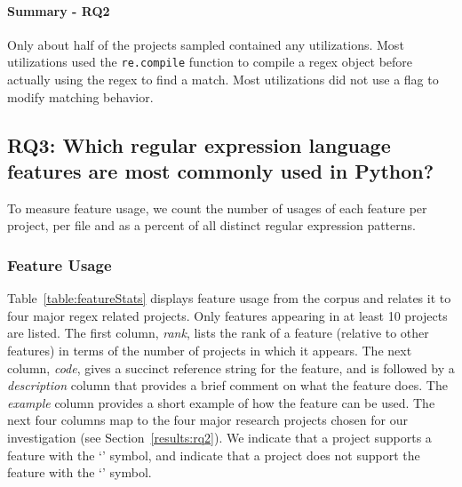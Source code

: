 

% 


\paragraph{Summary - RQ2}

Only about half of the projects sampled contained any utilizations.  Most utilizations used the {\tt re.compile} function to compile a regex object before actually using the regex to find a match.  Most utilizations did not use a flag to modify matching behavior.  





\subsection{RQ3: Which regular expression language features are most commonly used in Python?}
\label{results:rq3}

To measure feature usage, we  count the number of usages of each feature per project, per file and as a percent of all distinct regular expression patterns.



\subsubsection{Feature Usage}
\label{sec:featureUsage}
Table~\ref{table:featureStats} displays feature usage from the corpus and relates it to four major regex related projects. Only features appearing in at least 10 projects are listed.
The first column, \emph{rank}, lists the rank of a feature (relative to other features) in terms of the number of projects in which it appears. The next column, \emph{code}, gives a succinct reference string for the feature, and is followed by a \emph{description} column that provides a brief comment on what the feature does.  The \emph{example} column provides a short example of how the feature can be used.
The next four columns map to the four major research projects chosen for our investigation (see Section~\ref{results:rq2}).  We indicate that a project supports a feature with the `\yes' symbol, and indicate that a project does not support the feature with the `\no' symbol.



